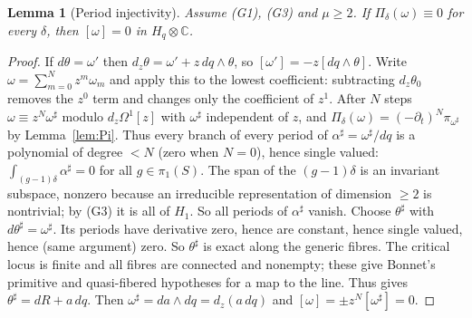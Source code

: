\documentclass[11pt]{article}
\numberwithin{equation}{section}
\newtheorem{lemma}[theorem]{Lemma}
\theoremstyle{definition}
\theoremstyle{remark}
\newcommand{\C}{\mathbb C}\newcommand{\Q}{\mathbb Q}\newcommand{\R}{\mathbb R}\newcommand{\Z}{\mathbb Z}
\newcommand{\Hq}{H_q}
\begin{document}
\begin{lemma}[Period injectivity]\label{lem:injective}
Assume \textup{(G1)}, \textup{(G3)} and $\mu\ge2$. If $\Pi_\delta(\omega)\equiv0$
for every $\delta$, then $[\omega]=0$ in $\Hq\otimes\C$.
\end{lemma}
\begin{proof}
If $d\theta=\omega'$ then $d_z\theta=\omega'+z\,dq\wedge\theta$, so
$[\omega']=-z[dq\wedge\theta]$. Write $\omega=\sum_{m=0}^Nz^m\omega_m$ and apply this to the lowest coefficient:
subtracting $d_z\theta_0$ removes the $z^0$ term and changes only the
coefficient of $z^1$. After $N$ steps $\omega\equiv z^N\omega^\sharp$ modulo
$d_z\Omega^1[z]$ with $\omega^\sharp$ independent of $z$, and
$\Pi_\delta(\omega)=(-\partial_t)^N\pi_{\omega^\sharp}$ by Lemma~\ref{lem:Pi}. Thus
every branch of every period of $\alpha^\sharp=\omega^\sharp/dq$ is a polynomial of
degree $<N$ (zero when $N=0$), hence single valued: $\int_{(g-1)\delta}\alpha^\sharp=0$ for all
$g\in\pi_1(S)$. The span of the $(g-1)\delta$ is an invariant subspace, nonzero
because an irreducible representation of dimension $\ge2$ is nontrivial; by
(G3) it is all of $H_1$. So all periods of $\alpha^\sharp$ vanish. Choose
$\theta^\sharp$ with $d\theta^\sharp=\omega^\sharp$. Its periods have derivative
zero, hence are constant, hence single valued, hence (same argument) zero. So
$\theta^\sharp$ is exact along the generic fibres. The critical locus is finite
and all fibres are connected and nonempty; these give Bonnet's primitive
and quasi-fibered hypotheses for a map to the line. Thus
\cite[Definitions~1.3--1.4 and Theorem~1.5]{Bonnet} gives
$\theta^\sharp=dR+a\,dq$. Then
$\omega^\sharp=da\wedge dq=d_z(a\,dq)$ and $[\omega]=\pm z^N[\omega^\sharp]=0$.
\end{proof}
\end{document}
